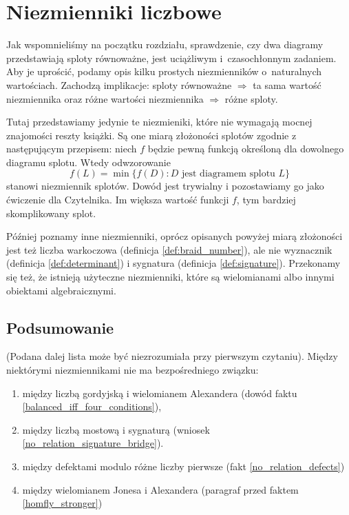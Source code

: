 \section{Niezmienniki liczbowe}
Jak wspomnieliśmy na początku rozdziału, sprawdzenie,
czy dwa diagramy przedstawiają sploty równoważne,
jest uciążliwym i~czasochłonnym zadaniem.
Aby je uprościć, podamy opis kilku prostych niezmienników o~naturalnych wartościach.
Zachodzą implikacje:
sploty równoważne $\Rightarrow$ ta sama wartość niezmiennika
oraz różne wartości niezmiennika $\Rightarrow$ różne sploty.

Tutaj przedstawiamy jedynie te niezmieniki, które nie wymagają mocnej znajomości reszty książki.
Są one miarą złożoności splotów zgodnie z następującym przepisem: niech $f$ będzie pewną funkcją określoną dla dowolnego diagramu splotu.
Wtedy odwzorowanie
\begin{equation}
    f(L) = \min \{f(D) : D \text{ jest diagramem splotu } L\}
\end{equation}
stanowi niezmiennik splotów.
Dowód jest trywialny i pozostawiamy go jako ćwiczenie dla Czytelnika.
Im większa wartość funkcji $f$, tym bardziej skomplikowany splot.

Później poznamy inne niezmienniki, oprócz opisanych powyżej miarą złożoności jest też liczba warkoczowa (definicja \ref{def:braid_number}), ale nie wyznacznik (definicja \ref{def:determinant}) i sygnatura (definicja \ref{def:signature}).
Przekonamy się też, że istnieją użyteczne niezmienniki, które są wielomianami albo innymi obiektami algebraicznymi.















\subsection{Podsumowanie}
(Podana dalej lista może być niezrozumiała przy pierwszym czytaniu).
Między niektórymi niezmiennikami nie ma bezpośredniego związku:
\begin{enumerate}
	\item między liczbą gordyjską i wielomianem Alexandera (dowód faktu \ref{balanced_iff_four_conditions}),
	\item między liczbą mostową i sygnaturą (wniosek \ref{no_relation_signature_bridge}).
	\item między defektami modulo różne liczby pierwsze (fakt \ref{no_relation_defects})
	\item między wielomianem Jonesa i Alexandera (paragraf przed faktem \ref{homfly_stronger})
\end{enumerate}

